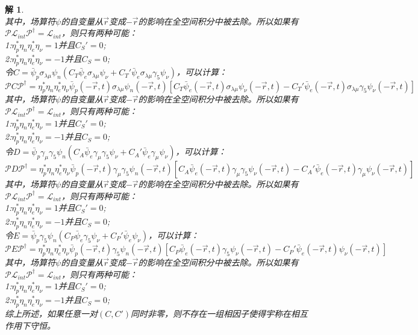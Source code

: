 \documentclass[UTF8,10pt,a4paper]{article}
\theoremstyle{Problem}%
\theoremstyle{Solution}%
\newtheorem*{sol}{解}%
\begin{document}
\begin{sol}
\[\]
其中，场算符$\psi$的自变量从$\vec{r}$变成$-\vec{r}$的影响在全空间积分中被去除。所以如果有$\mathcal{P}\mathcal{L}_{int}\mathcal{P}^\dagger = \mathcal{L}_{int}$，则只有两种可能： \\
1:$\eta_p^* \eta_n \eta_e^* \eta_\nu = 1$并且$C_S' = 0$; \\
2:$\eta_p^* \eta_n \eta_e^* \eta_\nu = -1$并且$C_S = 0$; \\
令$C = \bar{\psi}_p \sigma_{\lambda\mu} \psi_n(C_T\bar{\psi}_e \sigma_{\lambda\mu} \psi_\nu + C_T' \bar{\psi}_e \sigma_{\lambda\mu} \gamma_5 \psi_\nu)$，可以计算：
\[
    \mathcal{P} C \mathcal{P}^\dagger = \eta_p^* \eta_n \eta_e^* \eta_\nu \bar{\psi}_p(-\vec{r},t) \sigma_{\lambda\mu} \psi_n(-\vec{r},t) [C_T \bar{\psi}_e(-\vec{r},t) \sigma_{\lambda\mu} \psi_\nu(-\vec{r},t) - C_T' \bar{\psi}_e(-\vec{r},t) \sigma_{\lambda\mu} \gamma_5 \psi_\nu(-\vec{r},t)]
\]
其中，场算符$\psi$的自变量从$\vec{r}$变成$-\vec{r}$的影响在全空间积分中被去除。所以如果有$\mathcal{P}\mathcal{L}_{int}\mathcal{P}^\dagger = \mathcal{L}_{int}$，则只有两种可能： \\
1:$\eta_p^* \eta_n \eta_e^* \eta_\nu = 1$并且$C_S' = 0$; \\
2:$\eta_p^* \eta_n \eta_e^* \eta_\nu = -1$并且$C_S = 0$; \\
令$D = \bar{\psi}_p \gamma_\mu \gamma_5 \psi_n(C_A \bar{\psi}_e \gamma_\mu \gamma_5 \psi_\nu + C_A' \bar{\psi}_e \gamma_\mu \psi_\nu)$，可以计算：
\[
    \mathcal{P} D \mathcal{P}^\dagger = \eta_p^* \eta_n \eta_e^* \eta_\nu \bar{\psi}_p(-\vec{r},t) \gamma_\mu \gamma_5 \psi_n(-\vec{r},t) [C_A \bar{\psi}_e(-\vec{r},t) \gamma_\mu \gamma_5 \psi_\nu(-\vec{r},t) - C_A' \bar{\psi}_e(-\vec{r},t) \gamma_\mu \psi_\nu(-\vec{r},t)]
\]
其中，场算符$\psi$的自变量从$\vec{r}$变成$-\vec{r}$的影响在全空间积分中被去除。所以如果有$\mathcal{P}\mathcal{L}_{int}\mathcal{P}^\dagger = \mathcal{L}_{int}$，则只有两种可能： \\
1:$\eta_p^* \eta_n \eta_e^* \eta_\nu = 1$并且$C_S' = 0$; \\
2:$\eta_p^* \eta_n \eta_e^* \eta_\nu = -1$并且$C_S = 0$; \\
令$E = \bar{\psi}_p \gamma_5 \psi_n(C_P \bar{\psi}_e \gamma_5 \psi_\nu + C_P' \bar{\psi}_e \psi_\nu)$，可以计算：
\[
    \mathcal{P} E \mathcal{P}^\dagger = \eta_p^* \eta_n \eta_e^* \eta_\nu \bar{\psi}_p(-\vec{r},t) \gamma_5 \psi_n(-\vec{r},t) [C_P \bar{\psi}_e(-\vec{r},t) \gamma_5 \psi_\nu(-\vec{r},t) - C_P' \bar{\psi}_e(-\vec{r},t) \psi_\nu(-\vec{r},t)]
\]
其中，场算符$\psi$的自变量从$\vec{r}$变成$-\vec{r}$的影响在全空间积分中被去除。所以如果有$\mathcal{P}\mathcal{L}_{int}\mathcal{P}^\dagger = \mathcal{L}_{int}$，则只有两种可能： \\
1:$\eta_p^* \eta_n \eta_e^* \eta_\nu = 1$并且$C_S' = 0$; \\
2:$\eta_p^* \eta_n \eta_e^* \eta_\nu = -1$并且$C_S = 0$; \\
综上所述，如果任意一对$(C,C')$同时非零，则不存在一组相因子使得宇称在相互作用下守恒。
\end{sol}
\end{document}
